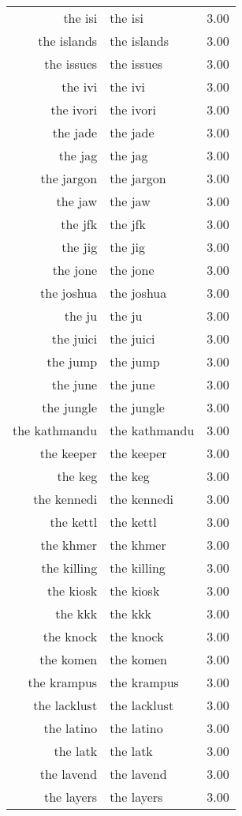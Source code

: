 \begin{table}[ht]
\begin{tabular}{rlr}
  the isi & the isi & 3.00 \\ 
  the islands & the islands & 3.00 \\ 
  the issues & the issues & 3.00 \\ 
  the ivi & the ivi & 3.00 \\ 
  the ivori & the ivori & 3.00 \\ 
  the jade & the jade & 3.00 \\ 
  the jag & the jag & 3.00 \\ 
  the jargon & the jargon & 3.00 \\ 
  the jaw & the jaw & 3.00 \\ 
  the jfk & the jfk & 3.00 \\ 
  the jig & the jig & 3.00 \\ 
  the jone & the jone & 3.00 \\ 
  the joshua & the joshua & 3.00 \\ 
  the ju & the ju & 3.00 \\ 
  the juici & the juici & 3.00 \\ 
  the jump & the jump & 3.00 \\ 
  the june & the june & 3.00 \\ 
  the jungle & the jungle & 3.00 \\ 
  the kathmandu & the kathmandu & 3.00 \\ 
  the keeper & the keeper & 3.00 \\ 
  the keg & the keg & 3.00 \\ 
  the kennedi & the kennedi & 3.00 \\ 
  the kettl & the kettl & 3.00 \\ 
  the khmer & the khmer & 3.00 \\ 
  the killing & the killing & 3.00 \\ 
  the kiosk & the kiosk & 3.00 \\ 
  the kkk & the kkk & 3.00 \\ 
  the knock & the knock & 3.00 \\ 
  the komen & the komen & 3.00 \\ 
  the krampus & the krampus & 3.00 \\ 
  the lacklust & the lacklust & 3.00 \\ 
  the latino & the latino & 3.00 \\ 
  the latk & the latk & 3.00 \\ 
  the lavend & the lavend & 3.00 \\ 
  the layers & the layers & 3.00 \\ 

\end{tabular}
\end{table}
